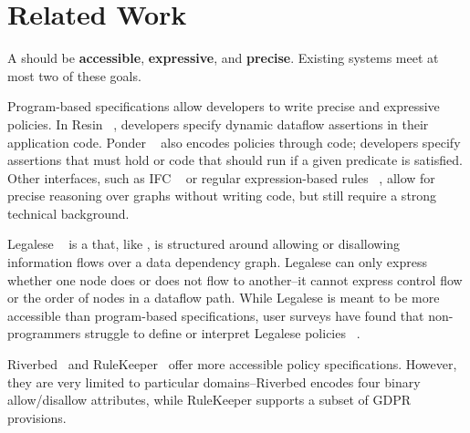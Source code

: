 \chapter{Related Work}

A \policylang{} should be \textbf{accessible}, \textbf{expressive}, and \textbf{precise}.
%
Existing systems meet at most two of these goals.
%

Program-based specifications allow developers to write precise and expressive policies.
%
In Resin ~\cite{resin}, developers specify dynamic dataflow assertions in their application code.
%
Ponder ~\cite{ponder} also encodes policies through code; developers specify assertions that must hold or code that should run if a given predicate is satisfied.
%
Other interfaces, such as IFC ~\cite{jif} or regular expression-based rules ~\cite{hotnets}, 
allow for precise reasoning over graphs without writing code, but still require a strong technical background.

Legalese ~\cite{legalese} is a \policylang{} that, like \syslang, is structured around allowing or disallowing information flows over a data dependency graph.
%
Legalese can only express whether one node does or does not flow to another--it cannot express control flow or the order of nodes in a dataflow path.
%
%
While Legalese is meant to be more accessible than program-based specifications, 
user surveys have found that non-programmers struggle to define or interpret Legalese policies ~\cite{legalese, privguard}.

Riverbed~\cite{riverbed} and RuleKeeper~\cite{rulekeeper} offer more accessible policy specifications.
%
However, they are very limited to particular domains--Riverbed encodes four binary allow/disallow attributes, while RuleKeeper supports a subset of GDPR provisions.
%
